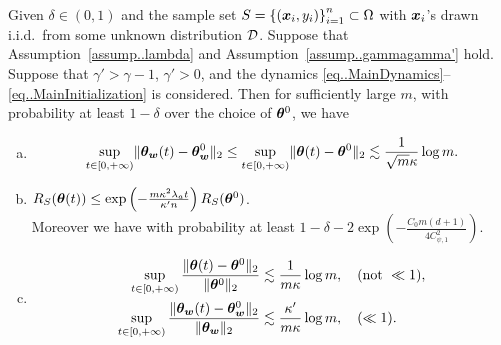 \documentclass{article}
\begin{document}
\begin{prop}\label{prop..WLazyRegime}
    Given $\delta\in(0,1)$ and the sample set $S = {\{(\bm{x}_i, y_i)\}}_{i=1}^n\subset\Omega$ with $\bm{x}_i$'s drawn i.i.d.\ from some unknown distribution $\mathcal{D}$. Suppose that Assumption~\ref{assump..lambda} and Assumption~\ref{assump..gammagamma'} hold.  Suppose that $\gamma'>\gamma-1$, $\gamma'>0$, and the dynamics \eqref{eq..MainDynamics}--\eqref{eq..MainInitialization} is considered. Then for sufficiently large $m$, with probability at least $1-\delta$ over the choice of $\bm{\theta}^0$, we have
    \begin{enumerate}[(a)]
        \item \begin{equation*}
                  \begin{aligned}
                      \sup\limits_{t\in[0,+\infty)}\lVert\bm{\theta}_{\bm{w}}(t)-\bm{\theta}_{\bm{w}}^0\rVert_2
                      \leq \sup\limits_{t\in[0,+\infty)}\lVert\bm{\theta}(t)-\bm{\theta}^0\rVert_2
                      \lesssim\frac{1}{\sqrt{m}\kappa}\log m.
                  \end{aligned}
              \end{equation*}
        \item $R_S(\bm{\theta}(t))\leq\exp\left(-\frac{m\kappa^2\lambda_a t}{\kappa'n}\right)R_S(\bm{\theta}^0)$. \\
              Moreover we have with probability at least $1-\delta-2\exp\left(-\frac{C_0m(d+1)}{4C_{\psi,1}^2}\right)$.
        \item \begin{equation*}
                  \begin{aligned}
                      \sup\limits_{t\in[0,+\infty)}\frac{\lVert\bm{\theta}(t)-\bm{\theta}^0\rVert_2}{\lVert\bm{\theta}^0\rVert_2}
                       & \lesssim\frac{1}{m\kappa}\log m, \quad (\text{not }\ll 1), \\
                      \sup\limits_{t\in[0,+\infty)}\frac{\lVert\bm{\theta}_{\bm{w}}(t)-\bm{\theta}_{\bm{w}}^0\rVert_2}{\lVert\bm{\theta}_{\bm{w}}\rVert_2}
                       & \lesssim\frac{\kappa'}{m\kappa}\log m, \quad (\ll 1).
                  \end{aligned}
              \end{equation*}
    \end{enumerate}
\end{prop}
\end{document}
